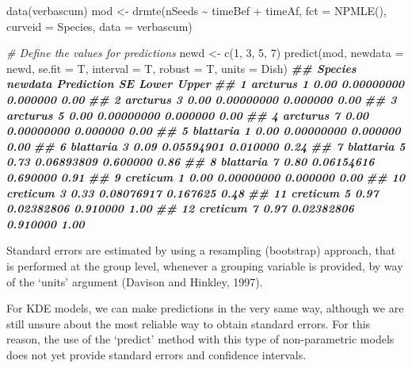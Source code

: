 \documentclass[
]{book}
\newenvironment{Shaded}{\begin{snugshade}}{\end{snugshade}}
\newcommand{\AttributeTok}[1]{\textcolor[rgb]{0.77,0.63,0.00}{#1}}
\newcommand{\CommentTok}[1]{\textcolor[rgb]{0.56,0.35,0.01}{\textit{#1}}}
\newcommand{\DecValTok}[1]{\textcolor[rgb]{0.00,0.00,0.81}{#1}}
\newcommand{\DocumentationTok}[1]{\textcolor[rgb]{0.56,0.35,0.01}{\textbf{\textit{#1}}}}
\newcommand{\FunctionTok}[1]{\textcolor[rgb]{0.00,0.00,0.00}{#1}}
\newcommand{\NormalTok}[1]{#1}
\newcommand{\OtherTok}[1]{\textcolor[rgb]{0.56,0.35,0.01}{#1}}
\newcommand{\SpecialCharTok}[1]{\textcolor[rgb]{0.00,0.00,0.00}{#1}}
\begin{document}
\begin{Shaded}
\begin{Highlighting}[]
\FunctionTok{data}\NormalTok{(verbascum)}
\NormalTok{mod }\OtherTok{\textless{}{-}} \FunctionTok{drmte}\NormalTok{(nSeeds }\SpecialCharTok{\textasciitilde{}}\NormalTok{ timeBef }\SpecialCharTok{+}\NormalTok{ timeAf, }\AttributeTok{fct =} \FunctionTok{NPMLE}\NormalTok{(),}
             \AttributeTok{curveid =}\NormalTok{ Species, }\AttributeTok{data =}\NormalTok{ verbascum)}

\CommentTok{\# Define the values for predictions}
\NormalTok{newd }\OtherTok{\textless{}{-}} \FunctionTok{c}\NormalTok{(}\DecValTok{1}\NormalTok{, }\DecValTok{3}\NormalTok{, }\DecValTok{5}\NormalTok{, }\DecValTok{7}\NormalTok{)}
\FunctionTok{predict}\NormalTok{(mod, }\AttributeTok{newdata =}\NormalTok{ newd, }\AttributeTok{se.fit =}\NormalTok{ T, }\AttributeTok{interval =}\NormalTok{ T,}
        \AttributeTok{robust =}\NormalTok{ T, }\AttributeTok{units =}\NormalTok{ Dish)}
\DocumentationTok{\#\#      Species newdata Prediction         SE    Lower Upper}
\DocumentationTok{\#\# 1   arcturus       1       0.00 0.00000000 0.000000  0.00}
\DocumentationTok{\#\# 2   arcturus       3       0.00 0.00000000 0.000000  0.00}
\DocumentationTok{\#\# 3   arcturus       5       0.00 0.00000000 0.000000  0.00}
\DocumentationTok{\#\# 4   arcturus       7       0.00 0.00000000 0.000000  0.00}
\DocumentationTok{\#\# 5  blattaria       1       0.00 0.00000000 0.000000  0.00}
\DocumentationTok{\#\# 6  blattaria       3       0.09 0.05594901 0.010000  0.24}
\DocumentationTok{\#\# 7  blattaria       5       0.73 0.06893809 0.600000  0.86}
\DocumentationTok{\#\# 8  blattaria       7       0.80 0.06154616 0.690000  0.91}
\DocumentationTok{\#\# 9   creticum       1       0.00 0.00000000 0.000000  0.00}
\DocumentationTok{\#\# 10  creticum       3       0.33 0.08076917 0.167625  0.48}
\DocumentationTok{\#\# 11  creticum       5       0.97 0.02382806 0.910000  1.00}
\DocumentationTok{\#\# 12  creticum       7       0.97 0.02382806 0.910000  1.00}
\end{Highlighting}
\end{Shaded}

Standard errors are estimated by using a resampling (bootstrap) approach, that is performed at the group level, whenever a grouping variable is provided, by way of the `units' argument (Davison and Hinkley, 1997).

For KDE models, we can make predictions in the very same way, although we are still unsure about the most reliable way to obtain standard errors. For this reason, the use of the `predict' method with this type of non-parametric models does not yet provide standard errors and confidence intervals.
\end{document}
